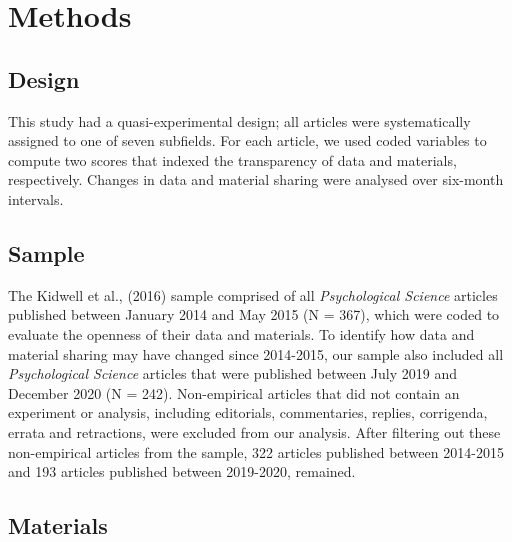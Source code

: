 \documentclass[
  english,
  man,floatsintext]{apa6}
\begin{document}
\hypertarget{methods}{%
\section{Methods}\label{methods}}

\hypertarget{design}{%
\subsection{Design}\label{design}}

This study had a quasi-experimental design; all articles were systematically assigned to one of seven subfields. For each article, we used coded variables to compute two scores that indexed the transparency of data and materials, respectively. Changes in data and material sharing were analysed over six-month intervals.

\hypertarget{sample}{%
\subsection{Sample}\label{sample}}

The Kidwell et al., (2016) sample comprised of all \emph{Psychological Science} articles published between January 2014 and May 2015 (N = 367), which were coded to evaluate the openness of their data and materials. To identify how data and material sharing may have changed since 2014-2015, our sample also included all \emph{Psychological Science} articles that were published between July 2019 and December 2020 (N = 242). Non-empirical articles that did not contain an experiment or analysis, including editorials, commentaries, replies, corrigenda, errata and retractions, were excluded from our analysis. After filtering out these non-empirical articles from the sample, 322 articles published between 2014-2015 and 193 articles published between 2019-2020, remained.

\hypertarget{materials}{%
\subsection{Materials}\label{materials}}
\end{document}
